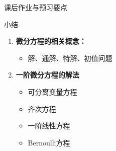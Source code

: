 \begin{frame}{课后作业与预习要点}
	\linespread{1.2}
	
\end{frame}

\begin{frame}[<+->]{小结}
	\linespread{1.5}
	\begin{enumerate}
	  \item {\bf 微分方程的相关概念：}
	  \begin{itemize}
	    \item 解、通解、特解、初值问题
	  \end{itemize}
	  \item {\bf 一阶微分方程的解法}
	  \begin{itemize}
	    \item 可分离变量方程
	    \item 齐次方程
	    \item 一阶线性方程
	    \item Bernoulli方程
	  \end{itemize}
	\end{enumerate}
\end{frame}